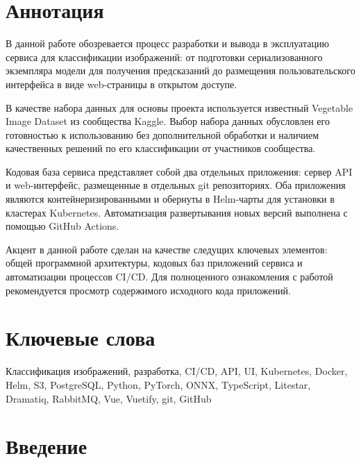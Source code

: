 \documentclass[a4paper,12pt]{extarticle}
\begin{document}
\newpage
\setcounter{page}{2}

{
	\hypersetup{linkcolor=black}
	\tableofcontents
}

\newpage

\newpage
\section*{Аннотация}   %
В данной работе обозревается процесс разработки и вывода в эксплуатацию сервиса для классификации
изображений: от подготовки сериализованного экземпляра модели для получения предсказаний до
размещения пользовательского интерфейса в виде web-страницы в открытом доступе.\par

В качестве набора данных для основы проекта используется известный Vegetable Image Dataset из
сообщества Kaggle. Выбор набора данных обусловлен его готовностью к использованию без дополнительной
обработки и наличием качественных решений по его классификации от участников сообщества.\par

Кодовая база сервиса представляет собой два отдельных приложения: сервер API и web-интерфейс,
размещенные в отдельных git репозиториях. Оба приложения являются контейнеризированными и обернуты в
Helm-чарты для установки в кластерах Kubernetes. Автоматизация развертывания новых версий выполнена
с помощью GitHub Actions.\par

Акцент в данной работе сделан на качестве следущих ключевых элементов: общей программной архитектуры,
кодовых баз приложений сервиса и автоматизации процессов CI/CD. Для полноценного ознакомления с
работой рекомендуется просмотр содержимого исходного кода приложений.


\section*{Ключевые слова}
Классификация изображений, разработка, CI/CD, API, UI, Kubernetes, Docker, Helm, S3, PostgreSQL,
Python, PyTorch, ONNX, TypeScript, Litestar, Dramatiq, RabbitMQ, Vue, Vuetify, git, GitHub
\pagebreak

\section{Введение}
\end{document}

